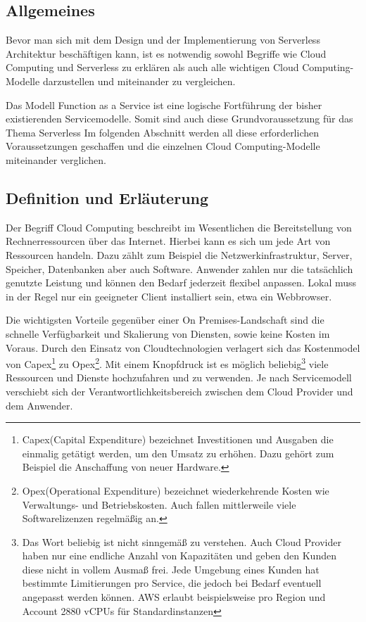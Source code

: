 \subsection{Allgemeines}

Bevor man sich mit dem Design und der Implementierung von Serverless Architektur beschäftigen kann, ist es notwendig sowohl Begriffe wie Cloud Computing und Serverless zu erklären als auch alle wichtigen Cloud Computing-Modelle darzustellen und miteinander zu vergleichen.

Das Modell Function as a Service ist eine logische Fortführung der bisher existierenden Servicemodelle.
Somit sind auch diese Grundvoraussetzung für das Thema Serverless
Im folgenden Abschnitt werden all diese erforderlichen Voraussetzungen geschaffen und die einzelnen Cloud Computing-Modelle miteinander verglichen.


\subsection{Definition und Erläuterung}
Der Begriff Cloud Computing beschreibt im Wesentlichen die Bereitstellung von Rechnerressourcen über das Internet.
Hierbei kann es sich um jede Art von Ressourcen handeln. Dazu zählt zum Beispiel die Netzwerkinfrastruktur, Server, Speicher, Datenbanken aber auch Software.
Anwender zahlen nur die tatsächlich genutzte Leistung und können den Bedarf jederzeit flexibel anpassen.
Lokal muss in der Regel nur ein geeigneter Client installiert sein, etwa ein Webbrowser.

Die wichtigsten Vorteile gegenüber einer On Premises-Landschaft sind die schnelle Verfügbarkeit und Skalierung von Diensten, sowie keine Kosten im Voraus.
Durch den Einsatz von Cloudtechnologien verlagert sich das Kostenmodel von Capex\footnote{ Capex(Capital Expenditure) bezeichnet Investitionen und Ausgaben die einmalig getätigt werden,
um den Umsatz zu erhöhen. Dazu gehört zum Beispiel die Anschaffung von neuer Hardware. } zu Opex\footnote{Opex(Operational Expenditure) bezeichnet wiederkehrende Kosten wie Verwaltungs- und Betriebskosten.
Auch fallen mittlerweile viele Softwarelizenzen regelmäßig an. }.
Mit einem Knopfdruck ist es möglich beliebig\footnote{Das Wort beliebig ist nicht sinngemäß zu verstehen.
Auch Cloud Provider haben nur eine endliche Anzahl von Kapazitäten und geben den Kunden diese nicht in vollem Ausmaß frei.
Jede Umgebung eines Kunden hat bestimmte Limitierungen pro Service, die jedoch bei Bedarf eventuell angepasst werden können.
AWS erlaubt beispielsweise pro Region und Account 2880 vCPUs für Standardinstanzen } viele Ressourcen und Dienste hochzufahren und zu verwenden.
Je nach Servicemodell verschiebt sich der Verantwortlichkeitsbereich zwischen dem Cloud Provider und dem Anwender.
\cite[]{CloudComputingDef}

